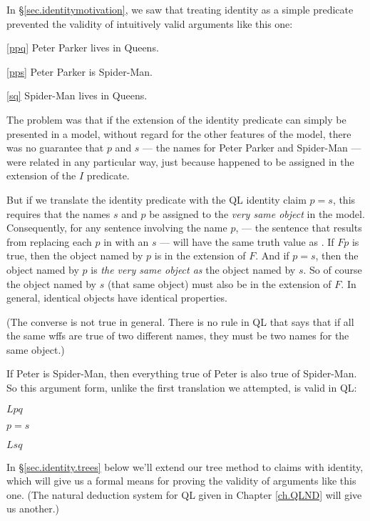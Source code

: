 In \S\ref{sec.identitymotivation}, we saw that treating identity as a simple predicate prevented the validity of intuitively valid arguments like  this one:

\begin{earg}
\item[\ref{ppq}] Peter Parker lives in Queens.
\item[\ref{pps}] Peter Parker is Spider-Man.
\item[\ref{sq}] Spider-Man lives in Queens.
\end{earg}

The problem was that if the extension of the identity predicate can simply be presented in a model, without regard for the other features of the model, there was no guarantee that $p$ and $s$ --- the names for Peter Parker and Spider-Man --- were related in any particular way, just because  happened to be assigned in the extension of the $I$ predicate.

But if we translate the identity predicate with the QL identity claim $p{=}s$, this requires that the names $s$ and $p$ be assigned to the \emph{very same object} in the model. Consequently, for any sentence \metaA{} involving the name $p$, \metaA{} --- the sentence that results from replacing each $p$ in \metaA{} with an $s$ --- will have the same truth value as \metaA{}. If $Fp$ is true, then the object named by $p$ is in the extension of $F$. And if $p{=}s$, then the object named by $p$ is \emph{the very same object as} the object named by $s$. So of course the object named by $s$ (that same object) must also be in the extension of $F$. In general, identical objects have identical properties.

(The converse is not true in general. There is no rule in QL that says that if all the same wffs are true of two different names, they must be two names for the same object.)

If Peter is Spider-Man, then everything true of Peter is also true of Spider-Man. So this argument form, unlike the first translation we attempted, is valid in QL:

\begin{earg}
\item[] $Lpq$
\item[] $p{=}s$
\item[\therefore] $Lsq$
\end{earg}

In \S\ref{sec.identity.trees} below we'll extend our tree method to claims with identity, which will give us a formal means for proving the validity of arguments like this one. (The natural deduction system for QL given in Chapter \ref{ch.QLND} will give us another.)





